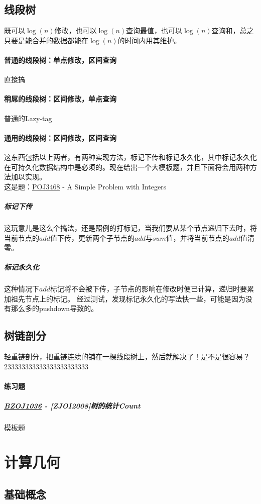 \documentclass[]{cpp}
\begin{document}
\subsection{线段树} 既可以$\log(n)$修改，也可以$\log(n)$查询最值，也可以$\log(n)$查询和，总之只要是能合并的数据都能在$\log(n)$的时间内用其维护。
\paragraph{普通的线段树：单点修改，区间查询} 直接搞
\paragraph{稍屌的线段树：区间修改，单点查询} 普通的Lazy-tag
\paragraph{通用的线段树：区间修改，区间查询}
	这东西包括以上两者，有两种实现方法，标记下传和标记永久化，其中标记永久化在可持久化数据结构中是必须的。现在给出一个大模板题，并且下面将会用两种方法加以实现。\\
	这是题：\href{http://poj.org/problem?id=3468}{POJ3468} - A Simple Problem with Integers
\subparagraph{标记下传}
	这玩意儿是这么个搞法，还是照例的打标记，当我们要从某个节点递归下去时，将当前节点的$add$值下传，更新两个子节点的$add$与$sum$值，并将当前节点的$add$值清零。
\subparagraph{标记永久化}
	这种情况下$add$标记将不会被下传，子节点的影响在修改时便已计算，递归时要累加祖先节点上的标记。
	经过测试，发现标记永久化的写法快一些，可能是因为没有那么多的pushdown导致的。
\subsection{树链剖分}
	轻重链剖分，把重链连续的铺在一棵线段树上，然后就解决了！是不是很容易？233333333333333333333333
\paragraph{练习题}
\subparagraph{\href{http://www.lydsy.com/JudgeOnline/problem.php?id=1036}{BZOJ1036} - [ZJOI2008]树的统计Count} 模板题
\section{计算几何}
\subsection{基础概念}
\end{document}
